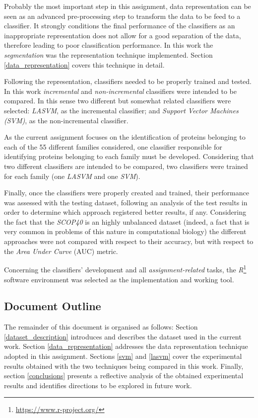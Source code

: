 \documentclass[11pt]{article}
\begin{document}
Probably the most important step in this assignment, data representation can be seen as an advanced pre-processing step to transform the data to be feed to a classifier. It strongly conditions the final performance of the classifiers as an inappropriate representation does not allow for a good separation of the data, therefore leading to poor classification performance. In this work the \emph{segmentation} was the representation technique implemented. Section \ref{data_representation} covers this technique in detail.

Following the representation, classifiers needed to be properly trained and tested. In this work \emph{incremental} and \emph{non-incremental} classifiers were intended to be compared. In this sense two different but somewhat related classifiers were selected: \emph{LASVM}, as the incremental classifier; and \emph{Support Vector Machines (SVM)}, as the non-incremental classifier.

As the current assignment focuses on the identification of proteins belonging to each of the 55 different families considered, one classifier responsible for identifying proteins belonging to each family must be developed. Considering that two different classifiers are intended to be compared, two classifiers were trained for each family (one \emph{LASVM} and one \emph{SVM}).

Finally, once the classifiers were properly created and trained, their performance was assessed with the testing dataset, following an analysis of the test results in order to determine which approach registered better results, if any. Considering the fact that the \emph{SCOP40} is an highly unbalanced dataset (indeed, a fact that is very common in problems of this nature in computational biology) the different approaches were not compared with respect to their accuracy, but with respect to the \emph{Area Under Curve} (AUC) metric.

Concerning the classifiers' development and all \emph{assignment-related} tasks, the \emph{R}\footnote{\url{https://www.r-project.org/}} software environment was selected as the implementation and working tool.

\subsection{Document Outline}

The remainder of this document is organised as follows: Section \ref{dataset_description} introduces and describes the dataset used in the current work. Section \ref{data_representation} addresses the data representation technique adopted in this assignment. Sections \ref{svm} and \ref{lasvm} cover the experimental results obtained with the two techniques being compared in this work. Finally, section \ref{conclusions} presents a reflective analysis of the obtained experimental results and identifies directions to be explored in future work.
\end{document}
